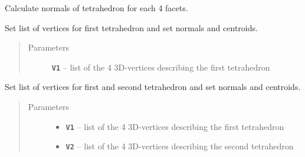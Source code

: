 \documentclass[letterpaper,10pt,english]{sphinxmanual}
\begin{document}
\begin{fulllineitems}
\begin{fulllineitems}
\end{fulllineitems}


\begin{fulllineitems}
\label{pk_src.intersection_tet_tet:pk_src.intersection_tet_tet.intersection_tet_tet.setNormals}
Calculate normals of tetrahedron for each 4 facets.

\end{fulllineitems}


\begin{fulllineitems}
\label{pk_src.intersection_tet_tet:pk_src.intersection_tet_tet.intersection_tet_tet.setV1}
Set list of vertices for first tetrahedron and set normals and centroids.
\begin{quote}\begin{description}
\item[{Parameters}] \leavevmode
\textbf{\texttt{V1}} -- list of the 4 3D-vertices describing the first tetrahedron

\end{description}\end{quote}

\end{fulllineitems}


\begin{fulllineitems}
\label{pk_src.intersection_tet_tet:pk_src.intersection_tet_tet.intersection_tet_tet.setV1V2}
Set list of vertices for first and second tetrahedron and set normals and centroids.
\begin{quote}\begin{description}
\item[{Parameters}] \leavevmode\begin{itemize}
\item {} 
\textbf{\texttt{V1}} -- list of the 4 3D-vertices describing the first tetrahedron

\item {} 
\textbf{\texttt{V2}} -- list of the 4 3D-vertices describing the second tetrahedron


\end{itemize}
\end{description}
\end{quote}
\end{fulllineitems}
\end{fulllineitems}
\end{document}
